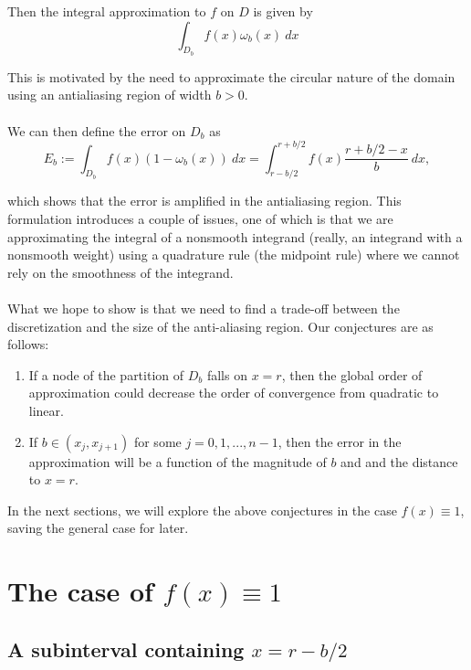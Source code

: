 \documentclass{article}
\begin{document}
\noindent
Then the integral approximation to $f$ on $D$ is given by
\[
    \int_{D_b} f(x) \omega_b(x) \: dx
\]

\noindent
This is motivated by the need to approximate the circular nature of the domain using an antialiasing region of width $b > 0$.
\\
\\
We can then define the error on $D_b$ as
\[
    E_b := \int_{D_b} f(x) (1 - \omega_b(x)) \: dx
    =
    \int_{r-b/2}^{r+b/2} f(x)
    \dfrac{r + b/2 - x}{b} \: dx,
\]

\noindent
which shows that the error is amplified in the antialiasing region. This formulation introduces a couple of issues, one of which is that we are approximating the integral of a nonsmooth integrand (really, an integrand with a nonsmooth weight) using a quadrature rule (the midpoint rule) where we cannot rely on the smoothness of the integrand.
\\
\\
What we hope to show is that we need to find a trade-off between the discretization and the size of the anti-aliasing region. Our conjectures are as follows:

\begin{enumerate}
    \item If a node of the partition of $D_b$ falls on $x = r$, then the global order of approximation could decrease the order of convergence from quadratic to linear.
    \item If $b \in (x_j, x_{j+1})$ for some $j = 0, 1, ..., n-1$, then the error in the approximation will be a function of the magnitude of $b$ and and the distance to $x = r$.    
\end{enumerate}

\noindent
In the next sections, we will explore the above conjectures in the case $f(x) \equiv 1$, saving the general case for later.

\newpage

\section{The case of $f(x) \equiv 1$}
\subsection{A subinterval containing $x = r - b/2$}
\end{document}
